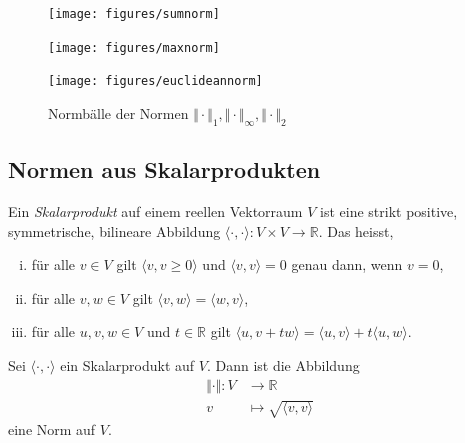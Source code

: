 \documentclass[../main.tex]{subfiles}
\begin{document}
\begin{figure}[htb] 
  \centering
  \begin{minipage}{0.33\textwidth}
    \centering
    \texttt{[image: figures/sumnorm]}
  \end{minipage}%
  \begin{minipage}{0.33\textwidth}
    \centering
    \texttt{[image: figures/maxnorm]}
  \end{minipage}%
  \begin{minipage}{0.33\textwidth}
    \centering
    \texttt{[image: figures/euclideannorm]}
  \end{minipage}%
  \caption{Normbälle der Normen
  $\Vert \cdot \Vert_1,
 \Vert \cdot \Vert_{\infty},
 \Vert \cdot \Vert_2$}%
  \label{fig:norms}
\end{figure}

\subsection*{Normen aus Skalarprodukten}
\begin{definition}
  Ein \emph{Skalarprodukt} auf einem reellen Vektorraum $V$ 
  ist eine strikt positive, symmetrische, bilineare Abbildung
  $\langle \cdot, \cdot \rangle \colon V \times V \to \mathbb{R}$.
  Das heisst,
  \begin{enumerate}[(i)]
    \item für alle $v \in V$ gilt $\langle v, v \geq 0 \rangle$ 
      und $\langle v, v \rangle = 0$ genau dann,
      wenn $v = 0$,
    \item für alle $v, w \in V$ gilt 
      $\langle v, w \rangle = \langle w, v \rangle$,
    \item für alle $u, v, w \in V$ und $t \in \mathbb{R}$ gilt
      $\langle u, v + tw \rangle = \langle u, v \rangle + t
      \langle u, w \rangle$.
  \end{enumerate}
\end{definition}

\begin{lemma*}
  Sei $\langle \cdot, \cdot \rangle$ ein Skalarprodukt auf $V$.
  Dann ist die Abbildung
  \begin{align*}
    \Vert \cdot \Vert \colon V & \to \mathbb{R} \\
    v & \mapsto \sqrt{\langle v, v \rangle}
  \end{align*}
  eine Norm auf $V$.
\end{lemma*}
\end{document}

